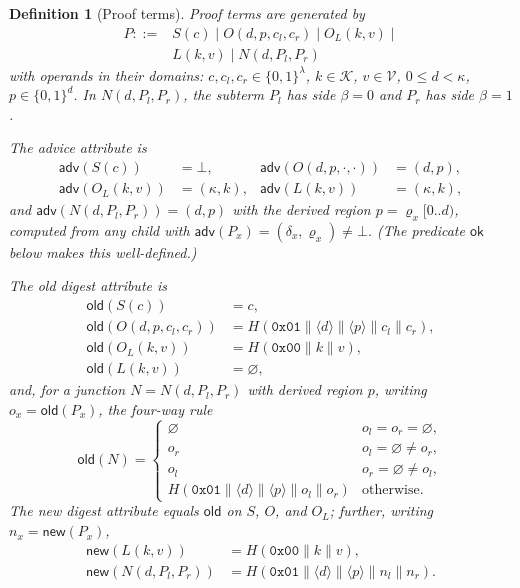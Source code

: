 \documentclass[twocolumn]{article}
\newtheorem{definition}{Definition}
\begin{document}
\begin{definition}[Proof terms]
\label{def:pterm}
Proof terms are generated by
\begin{align*}
P ::={} & S(c) \mid O(d, p, c_l, c_r) \mid O_L(k, v) \mid{}\\
        & L(k, v) \mid N(d, P_l, P_r)
\end{align*}
with operands in their domains: $c, c_l, c_r \in \{0,1\}^{\lambda}$, $k \in \mathcal{K}$, $v \in \mathcal{V}$, $0 \le d < \kappa$, $p \in \{0,1\}^{d}$. In $N(d, P_l, P_r)$, the subterm $P_l$ has side $\beta = 0$ and $P_r$ has side $\beta = 1$.

The \emph{advice} attribute is
\begin{align*}
\mathsf{adv}(S(c)) &= \bot, & \mathsf{adv}(O(d,p,\cdot,\cdot)) &= (d, p),\\
\mathsf{adv}(O_L(k,v)) &= (\kappa, k), & \mathsf{adv}(L(k,v)) &= (\kappa, k),
\end{align*}
and $\mathsf{adv}(N(d, P_l, P_r)) = (d, p)$ with the \emph{derived region} $p = \varrho_x[0..d)$, computed from any child with $\mathsf{adv}(P_x) = (\delta_x, \varrho_x) \neq \bot$. (The predicate $\mathsf{ok}$ below makes this well-defined.)

The \emph{old digest} attribute is
\begin{align*}
\mathsf{old}(S(c)) &= c,\\
\mathsf{old}(O(d,p,c_l,c_r)) &= H(\texttt{0x01}\|\langle d\rangle\|\langle p\rangle\|c_l\|c_r),\\
\mathsf{old}(O_L(k,v)) &= H(\texttt{0x00}\|k\|v),\\
\mathsf{old}(L(k,v)) &= \varnothing,
\end{align*}
and, for a junction $N = N(d, P_l, P_r)$ with derived region $p$, writing $o_x = \mathsf{old}(P_x)$, the \emph{four-way rule}
\[
\mathsf{old}(N) = \begin{cases}
\varnothing & o_l = o_r = \varnothing,\\
o_r & o_l = \varnothing \neq o_r,\\
o_l & o_r = \varnothing \neq o_l,\\
H(\texttt{0x01}\|\langle d\rangle\|\langle p\rangle\|o_l\|o_r) & \text{otherwise}.
\end{cases}
\]
The \emph{new digest} attribute equals $\mathsf{old}$ on $S$, $O$, and $O_L$; further, writing $n_x = \mathsf{new}(P_x)$,
\begin{align*}
\mathsf{new}(L(k,v)) &= H(\texttt{0x00}\|k\|v),\\
\mathsf{new}(N(d,P_l,P_r)) &= H(\texttt{0x01}\|\langle d\rangle\|\langle p\rangle\|n_l\|n_r).
\end{align*}


\end{definition}
\end{document}
